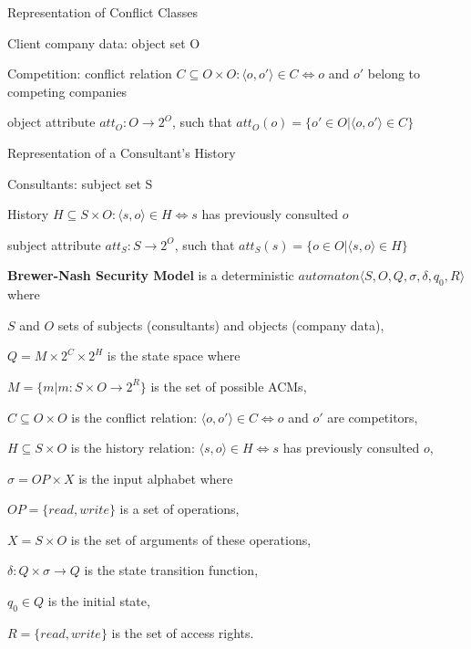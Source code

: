 \documentclass[a4paper]{article}
\renewcommand{\note}[2]{\begin{noteBox} \textbf{#1} #2 \end{noteBox}}
\begin{document}
\begin{multicols}{3}
    Representation of Conflict Classes
    \begin{itemize*}
        \item Client company data: object set O
        \item Competition: conflict relation $C\subseteq O\times O:\langle o,o'\rangle \in C\Leftrightarrow o$ and $o'$ belong to competing companies
        \item object attribute $att_O:O\rightarrow 2^O$, such that $att_O(o)=\{o'\in O|\langle o,o'\rangle \in C\}$
    \end{itemize*}

    Representation of a Consultant’s History
    \begin{itemize*}
        \item Consultants: subject set S
        \item History $H\subseteq S\times O:\langle s,o\rangle \in H\Leftrightarrow s$ has previously consulted $o$
        \item subject attribute $att_S:S\rightarrow 2^O$, such that $att_S(s)=\{o\in O|\langle s,o\rangle \in H\}$
    \end{itemize*}

    \note{Brewer-Nash Security Model}{ is a deterministic $automaton\langle S,O,Q,\sigma,\delta,q_0,R\rangle$ where
        \begin{itemize*}
            \item $S$ and $O$ sets of subjects (consultants) and objects (company data),
            \item $Q=M\times 2^C\times 2^H$ is the state space where
            \begin{itemize*}
                \item $M=\{m|m:S\times O\rightarrow 2^R\}$ is the set of possible ACMs,
                \item $C\subseteq O\times O$ is the conflict relation: $\langle o,o'\rangle \in C\Leftrightarrow o$ and $o'$ are competitors,
                \item $H\subseteq S\times O$ is the history relation: $\langle s,o\rangle \in H\Leftrightarrow s$ has previously
                consulted $o$,
            \end{itemize*}
            \item $\sigma=OP \times X$ is the input alphabet where
            \begin{itemize*}
                \item $OP=\{read,write\}$ is a set of operations,
                \item $X=S \times O$ is the set of arguments of these operations,
            \end{itemize*}
            \item $\delta:Q \times\sigma\rightarrow Q$ is the state transition function,
            \item $q_0\in Q$ is the initial state,
            \item $R=\{read,write\}$ is the set of access rights.
        \end{itemize*}
    }


\end{multicols}
\end{document}
